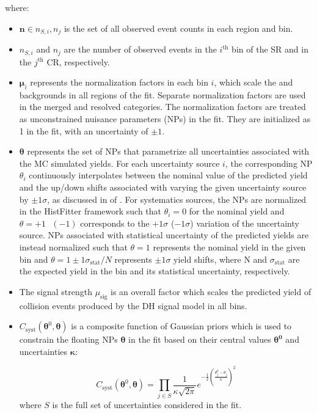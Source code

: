 where:

\begin{itemize}
    \item \(\boldsymbol{n}\in{n_{S,i}, n_j}\) is the set of all observed event counts in each region and bin.
    \item \(n_{S,i}\) and \(n_j\) are the number of observed events in the \(i^\text{th}\) bin of the SR and in the \(j^\text{th}\) CR, respectively.
    \item \(\boldsymbol{\mu}_i\) represents the normalization factors in each bin \(i\), which scale the \wjets and \ttbar backgrounds in all regions of the fit. Separate normalization factors are used in the merged and resolved categories. The normalization factors are treated as unconstrained nuisance parameters (NPs) in the fit. They are initialized as 1 in the fit, with an uncertainty of \(\pm1\).  
    \item \(\boldsymbol{\theta}\) represents the set of NPs that parametrize all uncertainties associated with the MC simulated yields. For each uncertainty source \(i\), the corresponding NP \(\theta_i\) continuously interpolates between the nominal value of the predicted yield and the up/down shifts associated with varying the given uncertainty source by \(\pm1\sigma\), as discussed in  of . For systematics sources, the NPs are normalized in the HistFitter framework such that \(\theta_i=0\) for the nominal yield and \(\theta=+1\text{ }(-1)\) corresponds to the \(+1\sigma\) (\(-1\sigma\)) variation of the uncertainty source. NPs associated with statistical uncertainty of the predicted yields are instead normalized such that \(\theta=1\) represents the nominal yield in the given bin and \(\theta=1\pm1\sigma_\text{stat}/N\) represents \(\pm1\sigma\) yield shifts, where N and \(\sigma_\text{stat}\) are the expected yield in the bin and its statistical uncertainty, respectively. 
    \item The signal strength \(\mu_\text{sig}\) is an overall factor which scales the predicted yield of collision events produced by the DH signal model in all bins.
    \item \(C_\text{syst}(\boldsymbol{\theta}^0, \boldsymbol{\theta})\) is a composite function of Gaussian priors which is used to constrain the floating NPs \(\boldsymbol{\theta}\) in the fit based on their central values \(\boldsymbol{\theta^0}\) and uncertainties \(\boldsymbol{\kappa}\):

    \begin{equation}
    \label{eq:gaussian_np}
    C_\text{syst}(\boldsymbol{\theta}^0, \boldsymbol{\theta})= \prod_{j\in S} \frac{1}{\kappa\sqrt{2\pi}}e^{-\frac{1}{2}(\frac{\theta^0_j-\theta_j}{\kappa})^2}
    \end{equation}
    \noindent where \(S\) is the full set of uncertainties considered in the fit.
    

\end{itemize}
